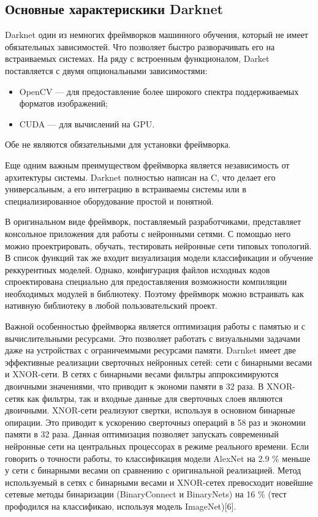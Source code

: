 \documentclass[a4paper,english,russian]{G2-105}
\begin{document}
\subsection{Основные характерискики Darknet}
\par Darknet один из немногих фреймворков машинного обучения, который не имеет обязательных зависимостей. Что позволяет быстро разворачивать его на встраиваемых системах. На ряду с встроенным функционалом, Darket поставляется с двумя опциональными зависимостями:
\begin{itemize}
\item OpenCV --- для предоставление более широкого спектра поддерживаемых форматов изображений;
\item CUDA --- для вычислений на GPU. 
\end{itemize}
\par Обе не являются обязательными для установки фреймворка.
\par Еще одним важным преимуществом фреймворка является независимость от архитектуры системы. Darknet полностью написан на C, что делает его универсальным, а его интеграцию в встраиваемы системы или в специализированное оборудование простой и понятной. 
\par В оригинальном виде фреймворк, поставляемый разработчиками, представляет консольное приложения для работы с нейронными сетями. С помощью него можно проектрировать, обучать, тестировать нейронные сети типовых топологий. В список функций так же входит визуализация модели классификации и обучение реккурентных моделей. Однако, конфигурация файлов исходных кодов спроектирована специально для предоставляения возможности компиляции необходимых модулей в библиотеку. Поэтому фреймворк можно встраивать как нативную библиотеку в любой пользовательский проект.
\par Важной особенностью фреймворка является оптимизация работы с памятью и с вычислительными ресурсами. Это позволяет работать с визуальными задачами даже на устройствах с ограничеммыми ресурсами памяти. Darnket имеет две эффективные реализации сверточных нейронных сетей: сети с бинарными весами и XNOR-сети. В сетях с бинарными весами фильтры аппроксимируются двоичными значениями, что приводит к экономи памяти в 32 раза. В XNOR-сетяк как фильтры, так и входные данные для сверточных слоев являются двоичными. XNOR-сети реализуют свертки, используя в основном бинарные опирации. Это приводит к ускорению сверточныз операций в 58 раз и экономии памяти в 32 раза. Данная оптимизация позволяет запускать современный нейронные сети на центральных процессорах в режиме реального времени. Если говорить о точности работы, то классификация модели AlexNet на 2.9 \% меньше у сети с бинарными весами оп сравнению с оригинальной реализацией. Метод используемый в сетях с бинарными весами и XNOR-сетех превосходит новейшие сетевые методы бинаризации (BinaryConnect и BinaryNets) на 16 \% (тест профодился на классификаю, используя модель ImageNet)[6].
\ttl
\end{document}
